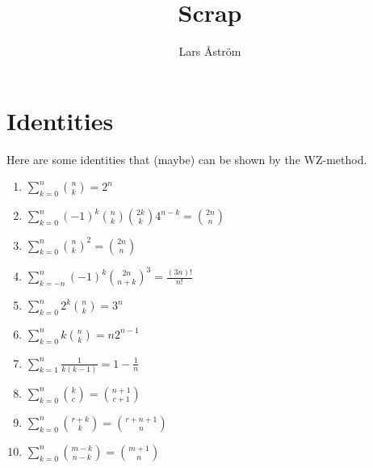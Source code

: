 \documentclass[a4paper, 12pt]{article}
\title{Scrap}
\author{Lars Åström}
\date{} %
\begin{document}
\maketitle
\section{Identities}
Here are some identities that (maybe) can be shown by the WZ-method.
\begin{enumerate}
  \item $\sum_{k=0}^n \binom{n}{k} = 2^n$
  \item $\sum_{k=0}^n (-1)^k\binom{n}{k}\binom{2k}{k}4^{n-k}=\binom{2n}{n}$
  \item $\sum_{k=0}^n \binom{n}{k}^2 = \binom{2n}{n}$
  \item $\sum_{k=-n}^n (-1)^k\binom{2n}{n+k}^3 = \frac{(3n)!}{n!}$
  \item $\sum_{k=0}^n 2^k\binom{n}{k} = 3^n$
  \item $\sum_{k=0}^n k\binom{n}{k} = n2^{n-1}$
  \item $\sum_{k=1}^n \frac{1}{k(k-1)} = 1-\frac{1}{n}$
  \item $\sum_{k=0}^n \binom{k}{c} = \binom{n+1}{c+1}$
  \item $\sum_{k=0}^n \binom{r+k}{k} = \binom{r+n+1}{n}$
  \item $\sum_{k=0}^n \binom{m-k}{n-k} = \binom{m+1}{n}$
\end{enumerate}
\end{document}
